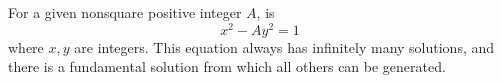 For a given nonsquare positive integer $A$,  is
$$x^2 - Ay^2 = 1$$
where $x, y$ are integers. This equation always has infinitely many solutions, and there is a fundamental solution from which all others can be generated.
